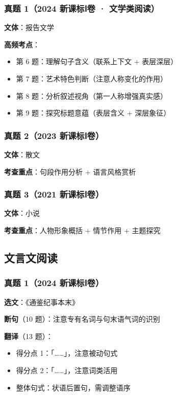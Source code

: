 \subsubsection{真题 1（2024 新课标Ⅰ卷 · 文学类阅读）}

\textbf{文体}：报告文学

\textbf{高频考点}：
\begin{itemize}
  \item 第 6 题：理解句子含义（联系上下文 + 表层深层）
  \item 第 7 题：艺术特色判断（注意人称变化的作用）
  \item 第 8 题：分析叙述视角（第一人称增强真实感）
  \item 第 9 题：探究标题意蕴（表层含义 + 深层象征）
\end{itemize}

\subsubsection{真题 2（2023 新课标Ⅰ卷）}

\textbf{文体}：散文

\textbf{考查重点}：句段作用分析 + 语言风格赏析

\subsubsection{真题 3（2021 新课标Ⅰ卷）}

\textbf{文体}：小说

\textbf{考查重点}：人物形象概括 + 情节作用 + 主题探究

\subsection{文言文阅读}

\subsubsection{真题 1（2024 新课标Ⅰ卷）}

\textbf{选文}：《通鉴纪事本末》

\textbf{断句}（10 题）：注意专有名词与句末语气词的识别

\textbf{翻译}（13 题）：
\begin{itemize}
  \item 得分点 1：「……」，注意被动句式
  \item 得分点 2：「……」，注意词类活用
  \item 整体句式：状语后置句，需调整语序
\end{itemize}

